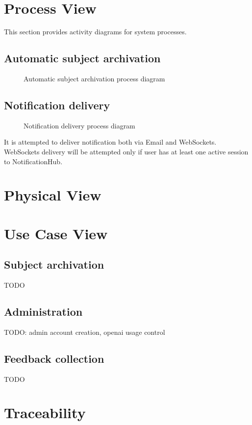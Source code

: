 \documentclass[
    english, %
]{VUMIFPSkursinis}
\begin{document}
\section{Process View}

This section provides activity diagrams for system processes.

\subsection{Automatic subject archivation}

\begin{figure}[ht]
    \centering
    
    \caption{Automatic subject archivation process diagram}
    \label{automatic-archivation-process}
\end{figure}

\subsection{Notification delivery}

\begin{figure}[ht]
    \centering
    
    \caption{Notification delivery process diagram}
    \label{notification-process}
\end{figure}

It is attempted to deliver notification both via Email and WebSockets. WebSockets delivery will be attempted only if user has at least one active session to NotificationHub.

\section{Physical View}

\section{Use Case View}

\subsection{Subject archivation}

TODO

\subsection{Administration}

TODO: admin account creation, openai usage control

\subsection{Feedback collection}

TODO

\section{Traceability}

\listoffigures
\printbibliography[heading=bibintoc]
\end{document}
